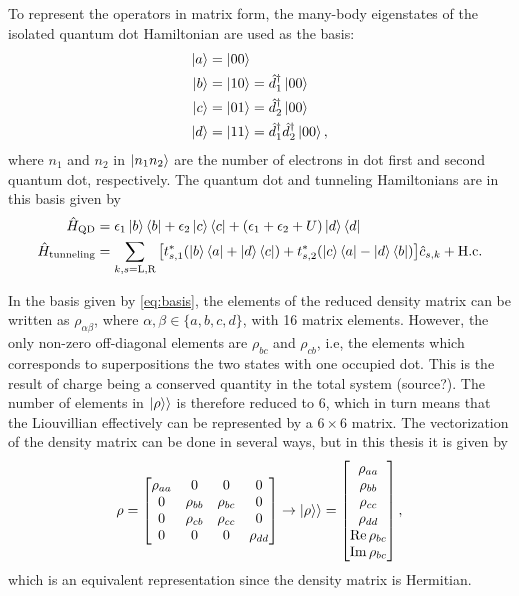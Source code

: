 \documentclass[../main.tex]{subfiles}
\begin{document}
To represent the operators in matrix form, the many-body eigenstates of the isolated quantum dot Hamiltonian are used as the basis:
\begin{equation}\label{eq:basis}
    \begin{aligned}
        \ket{a} &= \ket{00} \\
        \ket{b} &= \ket{10} = \hat d_1^\dag\ket{00}\\
        \ket{c} &= \ket{01} = \hat d_2^\dag\ket{00}\\
        \ket{d} &= \ket{11} = \hat d_1^\dag\hat d_2^\dag\ket{00},\\
    \end{aligned}
\end{equation}
where $n_1$ and $n_2$ in $\ket{n_1n_2}$ are the number of electrons in dot first and second quantum dot, respectively. The quantum dot and tunneling Hamiltonians are in this basis given by
\begin{equation}
    \begin{aligned}
        \hat H_\text{QD} &= \epsilon_1\ket{b}\bra{b} + \epsilon_2\ket{c}\bra{c} + (\epsilon_1 + \epsilon_2 + U)\ket{d}\bra{d} \\
        \hat H_\text{tunneling} &= \sum_{k,s=\text{L,R}} \big[t_{s,1}^*(\ket{b}\bra{a} + \ket{d}\bra{c}) + t_{s,2}^*(\ket{c}\bra{a} - \ket{d}\bra{b})\big]\hat c_{s,k} + \text{H.c}.
    \end{aligned}
\end{equation}

In the basis given by \cref{eq:basis}, the elements of the reduced density matrix can be written as $\rho_{\alpha\beta}$, where $\alpha,\beta\in\{a,b,c,d\}$, with 16 matrix elements. However, the only non-zero off-diagonal elements are $\rho_{bc}$ and $\rho_{cb}$, i.e, the elements which corresponds to superpositions the two states with one occupied dot. This is the result of charge being a conserved quantity in the total system (source?). The number of elements in $\ket{\rho}\rangle$ is therefore reduced to 6, which in turn means that the Liouvillian effectively can be represented by a $6\times6$ matrix. The vectorization of the density matrix can be done in several ways, but in this thesis it is given by
\begin{equation}\label{eq:order}
    \rho = \begin{bmatrix} \rho_{aa} & 0 & 0 & 0 \\
                    0 & \rho_{bb} & \rho_{bc} & 0 \\
                    0 & \rho_{cb} & \rho_{cc} & 0 \\
                    0 & 0 & 0 & \rho_{dd} \end{bmatrix} \rightarrow \ket{\rho}\rangle = \begin{bmatrix} \rho_{aa} \\ \rho_{bb} \\ \rho_{cc} \\ \rho_{dd} \\ \operatorname{Re}\rho_{bc} \\ \operatorname{Im}\rho_{bc}\end{bmatrix},
\end{equation}
which is an equivalent representation since the density matrix is Hermitian.
\end{document}
